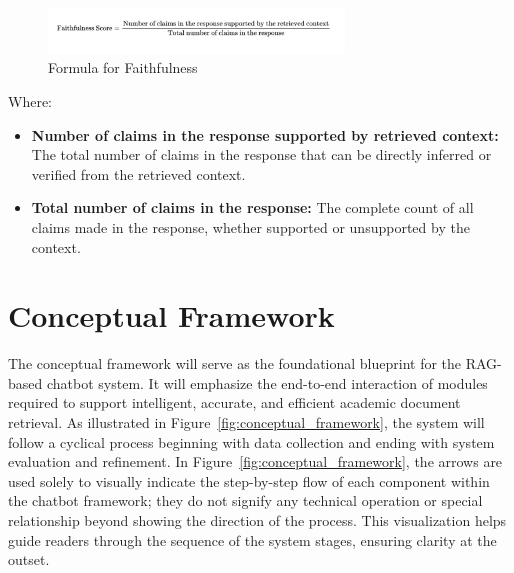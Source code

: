 \begin{refsection}

\begin{figure}[H]
\centering
\includegraphics[width=0.7\textwidth]{figures/faithfulness_formula.png}
\caption{Formula for Faithfulness}
\label{fig:faithfulness}
\end{figure}

\noindent Where:
\begin{itemize}
    \item \textbf{Number of claims in the response supported by retrieved context:} The total number of claims in the response that can be directly inferred or verified from the retrieved context.
    \item \textbf{Total number of claims in the response:} The complete count of all claims made in the response, whether supported or unsupported by the context.
\end{itemize}

\section{Conceptual Framework}

The conceptual framework will serve as the foundational blueprint for the RAG-based chatbot system. It will emphasize the end-to-end interaction of modules required to support intelligent, accurate, and efficient academic document retrieval. As illustrated in Figure~\ref{fig:conceptual_framework}, the system will follow a cyclical process beginning with data collection and ending with system evaluation and refinement. In Figure~\ref{fig:conceptual_framework}, the arrows are used solely to visually indicate the step-by-step flow of each component within the chatbot framework; they do not signify any technical operation or special relationship beyond showing the direction of the process. This visualization helps guide readers through the sequence of the system stages, ensuring clarity at the outset.


\end{refsection}
